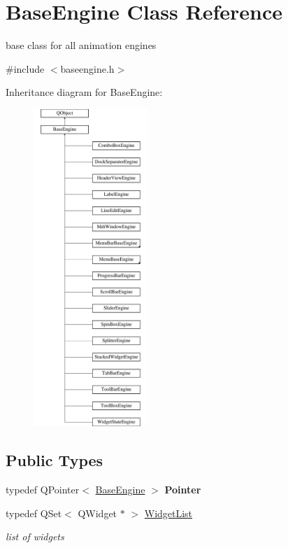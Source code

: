\hypertarget{class_base_engine}{}\section{Base\+Engine Class Reference}
\label{class_base_engine}


base class for all animation engines  




{\ttfamily \#include $<$baseengine.\+h$>$}

Inheritance diagram for Base\+Engine\+:\begin{figure}[H]
\begin{center}
\leavevmode
\includegraphics[height=12.000000cm]{class_base_engine}
\end{center}
\end{figure}
\subsection*{Public Types}
\begin{DoxyCompactItemize}
\item 
\mbox{\label{class_base_engine_aa5567a900597a469d4f5c4e7ef15e1fa}} 
typedef Q\+Pointer$<$ \hyperlink{class_base_engine}{Base\+Engine} $>$ {\bfseries Pointer}
\item 
\mbox{\label{class_base_engine_a2b0faec98a7eb68c91b502459c46a9c7}} 
typedef Q\+Set$<$ Q\+Widget $\ast$ $>$ \hyperlink{class_base_engine_a2b0faec98a7eb68c91b502459c46a9c7}{Widget\+List}
\begin{DoxyCompactList}\small\item\em list of widgets \end{DoxyCompactList}\end{DoxyCompactItemize}
